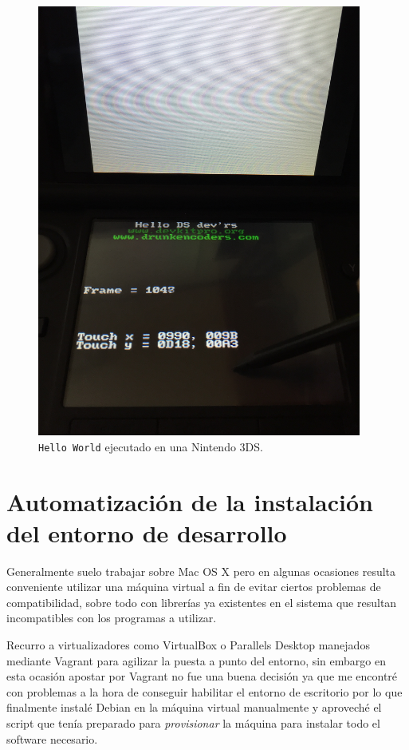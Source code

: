 \documentclass[12pt,english]{article}
\begin{document}
\begin{figure}[h!]
	\caption{{\tt Hello World} ejecutado en una Nintendo 3DS.}
	\label{fig:dependency}
	\centering
	\includegraphics[width=0.95\textwidth,angle=270]{P1Media/3DS}
\end{figure}
	
	\section{Automatización de la instalación del entorno de desarrollo}
	
	Generalmente suelo trabajar sobre Mac OS X pero en algunas ocasiones resulta conveniente utilizar una máquina virtual a fin de evitar ciertos problemas de compatibilidad, sobre todo con librerías ya existentes en el sistema que resultan incompatibles con los programas a utilizar.
	
	Recurro a virtualizadores como VirtualBox o Parallels Desktop manejados mediante Vagrant para agilizar la puesta a punto del entorno, sin embargo en esta ocasión apostar por Vagrant no fue una buena decisión ya que me encontré con problemas a la hora de conseguir habilitar el entorno de escritorio por lo que finalmente instalé Debian en la máquina virtual manualmente y aproveché el script que tenía preparado para \emph{provisionar} la máquina para instalar todo el software necesario.
	
\end{document}
